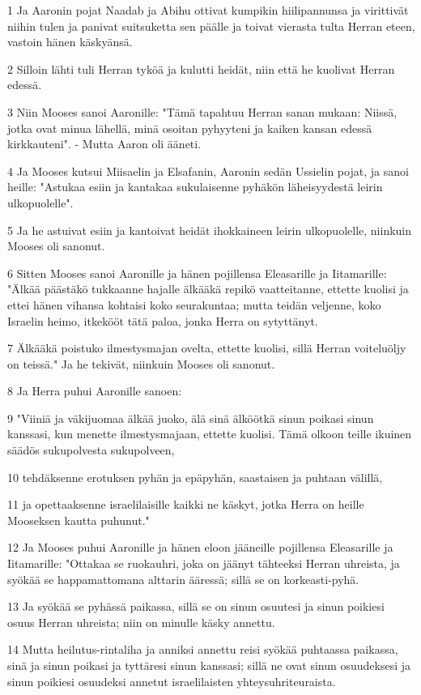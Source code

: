 \par 1 Ja Aaronin pojat Naadab ja Abihu ottivat kumpikin hiilipannunsa ja virittivät niihin tulen ja panivat suitsuketta sen päälle ja toivat vierasta tulta Herran eteen, vastoin hänen käskyänsä.
\par 2 Silloin lähti tuli Herran tyköä ja kulutti heidät, niin että he kuolivat Herran edessä.
\par 3 Niin Mooses sanoi Aaronille: "Tämä tapahtuu Herran sanan mukaan: Niissä, jotka ovat minua lähellä, minä osoitan pyhyyteni ja kaiken kansan edessä kirkkauteni". - Mutta Aaron oli ääneti.
\par 4 Ja Mooses kutsui Miisaelin ja Elsafanin, Aaronin sedän Ussielin pojat, ja sanoi heille: "Astukaa esiin ja kantakaa sukulaisenne pyhäkön läheisyydestä leirin ulkopuolelle".
\par 5 Ja he astuivat esiin ja kantoivat heidät ihokkaineen leirin ulkopuolelle, niinkuin Mooses oli sanonut.
\par 6 Sitten Mooses sanoi Aaronille ja hänen pojillensa Eleasarille ja Iitamarille: "Älkää päästäkö tukkaanne hajalle älkääkä repikö vaatteitanne, ettette kuolisi ja ettei hänen vihansa kohtaisi koko seurakuntaa; mutta teidän veljenne, koko Israelin heimo, itkekööt tätä paloa, jonka Herra on sytyttänyt.
\par 7 Älkääkä poistuko ilmestysmajan ovelta, ettette kuolisi, sillä Herran voiteluöljy on teissä." Ja he tekivät, niinkuin Mooses oli sanonut.
\par 8 Ja Herra puhui Aaronille sanoen:
\par 9 "Viiniä ja väkijuomaa älkää juoko, älä sinä älköötkä sinun poikasi sinun kanssasi, kun menette ilmestysmajaan, ettette kuolisi. Tämä olkoon teille ikuinen säädös sukupolvesta sukupolveen,
\par 10 tehdäksenne erotuksen pyhän ja epäpyhän, saastaisen ja puhtaan välillä,
\par 11 ja opettaaksenne israelilaisille kaikki ne käskyt, jotka Herra on heille Mooseksen kautta puhunut."
\par 12 Ja Mooses puhui Aaronille ja hänen eloon jääneille pojillensa Eleasarille ja Iitamarille: "Ottakaa se ruokauhri, joka on jäänyt tähteeksi Herran uhreista, ja syökää se happamattomana alttarin ääressä; sillä se on korkeasti-pyhä.
\par 13 Ja syökää se pyhässä paikassa, sillä se on sinun osuutesi ja sinun poikiesi osuus Herran uhreista; niin on minulle käsky annettu.
\par 14 Mutta heilutus-rintaliha ja anniksi annettu reisi syökää puhtaassa paikassa, sinä ja sinun poikasi ja tyttäresi sinun kanssasi; sillä ne ovat sinun osuudeksesi ja sinun poikiesi osuudeksi annetut israelilaisten yhteysuhriteuraista.

